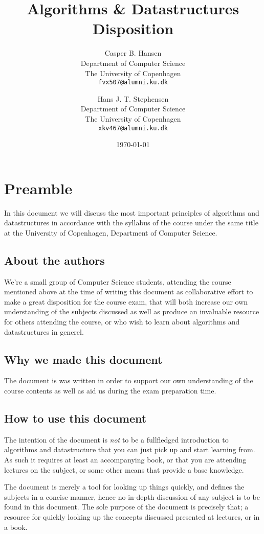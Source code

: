 \documentclass[11pt,english]{book}
\title
{
	\vspace{1in}
	Algorithms \& Datastructures\\
	\huge Disposition
}
\author
{
	Casper B. Hansen\\
	\small Department of Computer Science\\
	\small The University of Copenhagen\\
	\texttt{fvx507@alumni.ku.dk}
	\and
	Hans J. T. Stephensen\\
	\small Department of Computer Science\\
	\small The University of Copenhagen\\
	\texttt{xkv467@alumni.ku.dk}
}
\date{\today}
\begin{document}
\maketitle
\thispagestyle{empty}


\newpage
\pagestyle{fancy}

\chapter*{Preamble}
In this document we will discuss the most important principles of algorithms
and datastructures in accordance with the syllabus of the course under the
same title at the University of Copenhagen, Department of Computer Science.

\section*{About the authors}
We're a small group of Computer Science students, attending the course
mentioned above at the time of writing this document as collaborative effort
to make a great disposition for the course exam, that will both increase our
own understanding of the subjects discussed as well as produce an invaluable
resource for others attending the course, or who wish to learn about
algorithms and datastructures in generel.

\section*{Why we made this document}
The document is was written in order to support our own understanding of the
course contents as well as aid us during the exam preparation time.

\section*{How to use this document}
The intention of the document is \textit{not} to be a fullfledged introduction
to algorithms and datastructure that you can just pick up and start learning
from. As such it requires at least an accompanying book, or that you are
attending lectures on the subject, or some other means that provide a base
knowledge.

The document is merely a tool for looking up things quickly, and defines the
subjects in a concise manner, hence no in-depth discussion of any subject is
to be found in this document. The sole purpose of the document is precisely
that; a resource for quickly looking up the concepts discussed presented at
lectures, or in a book.
\end{document}
